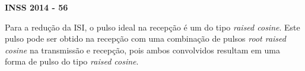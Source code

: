 \textbf{INSS 2014 - 56}

Para a redução da ISI, o pulso ideal na recepção é um do tipo \textit{raised cosine}. Este pulso pode ser obtido na recepção com uma combinação de pulsos \textit{root raised cosine} na transmissão e recepção, pois ambos convolvidos resultam em uma forma de pulso do tipo \textit{raised cosine}.